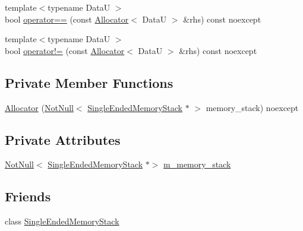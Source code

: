 \begin{DoxyCompactItemize}
\item 
{\footnotesize template$<$typename DataU $>$ }\\bool \hyperlink{classmage_1_1_single_ended_memory_stack_1_1_allocator_a47f5e7baf66ddebc8aec402c6a9f1eef}{operator==} (const \hyperlink{classmage_1_1_single_ended_memory_stack_1_1_allocator}{Allocator}$<$ DataU $>$ \&rhs) const noexcept
\item 
{\footnotesize template$<$typename DataU $>$ }\\bool \hyperlink{classmage_1_1_single_ended_memory_stack_1_1_allocator_ae8b77280f1f31e30cb1536f8ecae08c9}{operator!=} (const \hyperlink{classmage_1_1_single_ended_memory_stack_1_1_allocator}{Allocator}$<$ DataU $>$ \&rhs) const noexcept
\end{DoxyCompactItemize}
\subsection*{Private Member Functions}
\begin{DoxyCompactItemize}
\item 
\hyperlink{classmage_1_1_single_ended_memory_stack_1_1_allocator_a5e1c5692c525deba61702308b689f147}{Allocator} (\hyperlink{namespacemage_a8769f9d670d6b585ea306cb1062af94b}{Not\+Null}$<$ \hyperlink{classmage_1_1_single_ended_memory_stack}{Single\+Ended\+Memory\+Stack} $\ast$ $>$ memory\+\_\+stack) noexcept
\end{DoxyCompactItemize}
\subsection*{Private Attributes}
\begin{DoxyCompactItemize}
\item 
\hyperlink{namespacemage_a8769f9d670d6b585ea306cb1062af94b}{Not\+Null}$<$ \hyperlink{classmage_1_1_single_ended_memory_stack}{Single\+Ended\+Memory\+Stack} $\ast$$>$ \hyperlink{classmage_1_1_single_ended_memory_stack_1_1_allocator_a23af772fad1588e6b4ead9c48bab36e2}{m\+\_\+memory\+\_\+stack}
\end{DoxyCompactItemize}
\subsection*{Friends}
\begin{DoxyCompactItemize}
\item 
class \hyperlink{classmage_1_1_single_ended_memory_stack_1_1_allocator_a3f3449e5c2caa1666a293b36db6f5a54}{Single\+Ended\+Memory\+Stack}
\end{DoxyCompactItemize}


